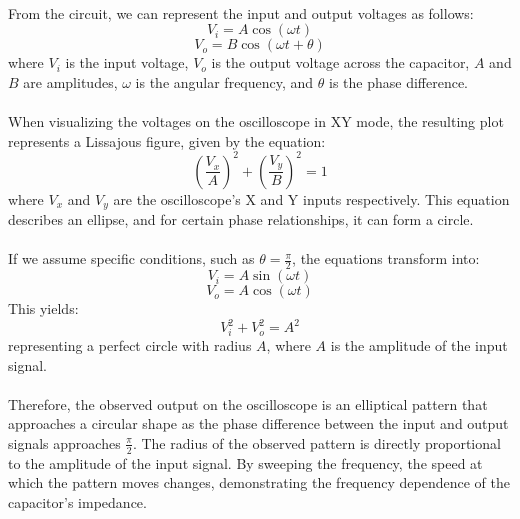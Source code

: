 \documentclass[11pt]{article}
\begin{document}
\begin{question}
{        \paragraph*{}
        From the circuit, we can represent the input and output voltages as follows:
        \begin{equation*}
            V_i = A \cos(\omega t)
        \end{equation*}
        \begin{equation*}
            V_o = B \cos(\omega t + \theta)
        \end{equation*}
        where $V_i$ is the input voltage, $V_o$ is the output voltage across the capacitor,
        $A$ and $B$ are amplitudes, $\omega$ is the angular frequency, and $\theta$ is the phase difference.

        \paragraph*{}
        When visualizing the voltages on the oscilloscope in XY mode, the resulting plot
        represents a Lissajous figure, given by the equation:
        \begin{equation*}
            \left(\frac{V_x}{A}\right)^2 + \left(\frac{V_y}{B}\right)^2 = 1
        \end{equation*}
        where $V_x$ and $V_y$ are the oscilloscope's X and Y inputs respectively.
        This equation describes an ellipse, and for certain phase relationships, it can form a circle.

        \paragraph*{}
        If we assume specific conditions, such as $\theta = \frac{\pi}{2}$, the equations transform into:
        \begin{equation*}
            V_i = A \sin(\omega t)
        \end{equation*}
        \begin{equation*}
            V_o = A \cos(\omega t)
        \end{equation*}
        This yields:
        \begin{equation*}
            V_i^2 + V_o^2 = A^2
        \end{equation*}
        representing a perfect circle with radius $A$, where $A$ is the amplitude of the input signal.

        \paragraph*{}
        Therefore, the observed output on the oscilloscope is an elliptical pattern that
        approaches a circular shape as the phase difference between the input and output signals
        approaches $\frac{\pi}{2}$. The radius of the observed pattern is directly proportional to the
        amplitude of the input signal. By sweeping the frequency, the speed at which the pattern moves changes,
        demonstrating the frequency dependence of the capacitor's impedance.
    }

\end{question}
\end{document}
